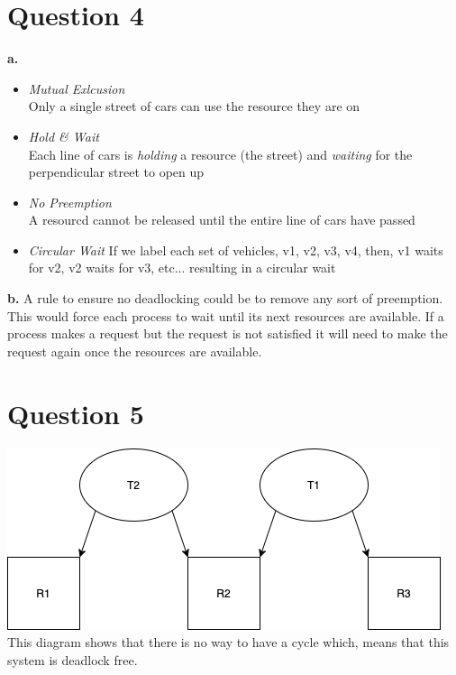 \documentclass[11pt]{article}
\begin{document}
\section*{Question 4}
\textbf{a.}\\
\begin{itemize}
\item \emph{Mutual Exlcusion}\\
    Only a single street of cars can use the resource they are on
\item \emph{Hold \& Wait}\\
    Each line of cars is \emph{holding} a resource (the street)
    and \emph{waiting} for the perpendicular street to open up 
\item \emph{No Preemption}\\
    A resourcd cannot be released until the entire line of cars 
    have passed
\item \emph{Circular Wait}
    If we label each set of vehicles, v1, v2, v3, v4, then, 
    v1 waits for v2, v2 waits for v3, etc... resulting in a circular 
    wait
\end{itemize}
\textbf{b.}
A rule to ensure no deadlocking could be to remove any sort 
of preemption. This would force each process to wait until 
its next resources are available. If a process makes a request 
but the request is not satisfied it will need to make the request 
again once the resources are available. 
\section*{Question 5}
\includegraphics[scale=0.5]{COMS352HW6Q5}\\
This diagram shows that there is no way to have a cycle which,
means that this system is deadlock free.
\end{document}
